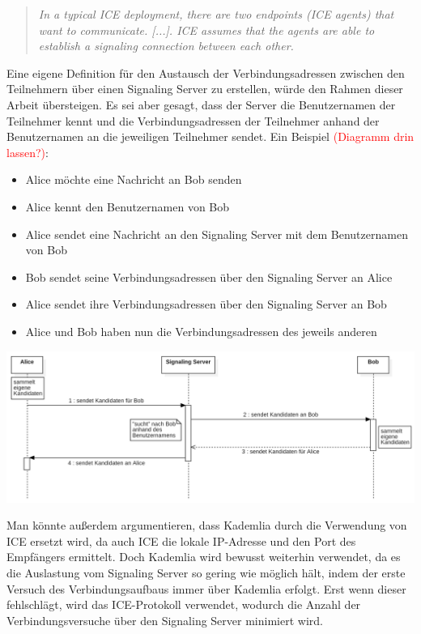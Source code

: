 \begin{quote}
    \textit{In a typical ICE deployment, there are two endpoints (ICE agents)
    that want to communicate. [...]. ICE assumes that the agents are able to
    establish a signaling connection between each other.} \parencite[S. 7]{rfc8445_ICE}
\end{quote}

\noindent Eine eigene Definition für den Austausch der Verbindungsadressen zwischen den Teilnehmern über einen Signaling Server zu erstellen, würde den Rahmen dieser Arbeit übersteigen. Es sei aber gesagt, dass der Server die Benutzernamen der Teilnehmer kennt und die Verbindungsadressen der Teilnehmer anhand der Benutzernamen an die jeweiligen Teilnehmer sendet. Ein Beispiel \textcolor{red}{(Diagramm drin lassen?)}:

\begin{itemize}
    \item Alice möchte eine Nachricht an Bob senden
    \item Alice kennt den Benutzernamen von Bob
    \item Alice sendet eine Nachricht an den Signaling Server mit dem Benutzernamen von Bob
    \item Bob sendet seine Verbindungsadressen über den Signaling Server an Alice
    \item Alice sendet ihre Verbindungsadressen über den Signaling Server an Bob
    \item Alice und Bob haben nun die Verbindungsadressen des jeweils anderen
\end{itemize}

\begin{center}
    \captionsetup{type=figure}
    \includegraphics[width=1.0\linewidth]{images/signaling_sequence.png}
    \label{fig:signaling_server}
\end{center}

\noindent Man könnte außerdem argumentieren, dass Kademlia durch die Verwendung von ICE ersetzt wird, da auch ICE  die lokale IP-Adresse und den Port des Empfängers ermittelt. Doch Kademlia wird bewusst weiterhin verwendet, da es die Auslastung vom Signaling Server so gering wie möglich hält, indem der erste Versuch des Verbindungsaufbaus immer über Kademlia erfolgt. Erst wenn dieser fehlschlägt, wird das ICE-Protokoll verwendet, wodurch die Anzahl der Verbindungsversuche über den Signaling Server minimiert wird.



